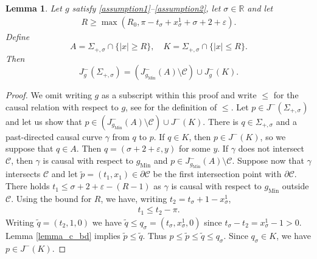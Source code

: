 \documentclass[11pt,letterpaper]{amsart}
\newtheorem{Lemma}[Theorem]{Lemma}
\theoremstyle{definition}
\numberwithin{equation}{section}
\newcommand{\eps}{\varepsilon}
\newcommand{\p}{\partial}
\newcommand{\gm}{g_{\mathrm{Min}}}
\def\p{\partial}
\def\R{\mathbb R}
\begin{document}
\begin{Lemma}\label{lem_near_far_J}
Let $g$ satisfy \eqref{assumption1}--\eqref{assumption2}, let $\sigma \in \R$ and let 
    \begin{align*}
R \geq \max(R_0, \pi - t_\sigma + x_\sigma^1 + \sigma + 2 + \eps).
    \end{align*}
Define
\[
A = \Sigma_{+,\sigma} \cap \{|x| \ge R\}, 
\quad
K = \Sigma_{+,\sigma} \cap \{|x| \le R\}.
\]
Then
\[
J_{g}^-(\Sigma_{+,\sigma}) = (J_{\gm}^-(A) \setminus \mathcal C) \cup J_{g}^-(K).
\]
\end{Lemma}
\begin{proof}
We omit writing $g$ as a subscript within this proof and write $\le$ for the causal relation with respect to $g$, see \cite[p.\ 402]{oneill1983} for the definition of $\le$.
Let $p \in J^-(\Sigma_{+,\sigma})$
and let us show that $p \in (J_{\gm}^-(A) \setminus \mathcal C) \cup J^-(K)$.
There is $q \in \Sigma_{+,\sigma}$ and a past-directed causal curve $\gamma$ from $q$ to $p$. If $q \in K$, then $p \in J^-(K)$, so we suppose that $q \in A$. Then $q = (\sigma + 2 + \eps, y)$ for some $y$.
If $\gamma$ does not intersect $\mathcal C$, 
then $\gamma$ is causal with respect to $\gm$ and 
$p \in J_{\gm}^-(A) \setminus \mathcal C$.
Suppose now that $\gamma$ intersects $\mathcal C$ and let $\tilde p = (t_1, x_1) \in \p \mathcal C$ be the first intersection point with $\p \mathcal C$. 
There holds $t_1 \leq \sigma + 2 + \eps - (R-1)$ as $\gamma$ is causal with respect to $\gm$ outside $\mathcal C$. Using the bound for $R$, we have, writing $t_2 = t_\sigma + 1 - x_\sigma^1$, 
    \begin{align*}
t_1 \leq  t_2 - \pi.
    \end{align*}
Writing $\tilde q = (t_2, 1, 0)$ we have $\tilde q \le q_\sigma = (t_\sigma, x_\sigma^1, 0)$ since $t_\sigma - t_2 = x_\sigma^1 - 1 > 0$. Lemma \ref{lemma_c_bd} implies $\tilde{p} \leq \tilde{q}$. Thus $p \le \tilde p \le \tilde q \le q_\sigma$. Since $q_\sigma \in K$, we have $p \in J^-(K)$.


\end{proof}
\end{document}
